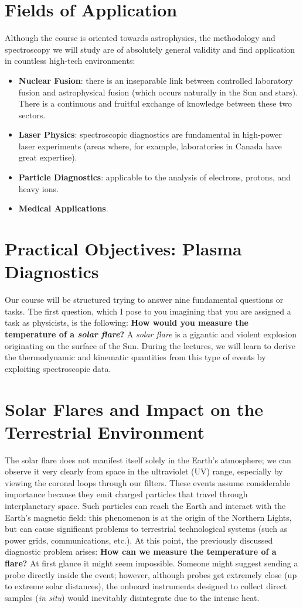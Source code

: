 \section{Fields of Application}
Although the course is oriented towards astrophysics, the methodology and spectroscopy we will study are of absolutely general validity and find application in countless high-tech environments:\begin{itemize}\item \textbf{Nuclear Fusion}: there is an inseparable link between controlled laboratory fusion and astrophysical fusion (which occurs naturally in the Sun and stars). There is a continuous and fruitful exchange of knowledge between these two sectors.\item \textbf{Laser Physics}: spectroscopic diagnostics are fundamental in high-power laser experiments (areas where, for example, laboratories in Canada have great expertise).\item \textbf{Particle Diagnostics}: applicable to the analysis of electrons, protons, and heavy ions.\item \textbf{Medical Applications}.\end{itemize}

\section{Practical Objectives: Plasma Diagnostics}
Our course will be structured trying to answer nine fundamental questions or tasks. The first question, which I pose to you imagining that you are assigned a task as physicists, is the following: \textbf{How would you measure the temperature of a \textit{solar flare}?} A \textit{solar flare} is a gigantic and violent explosion originating on the surface of the Sun. During the lectures, we will learn to derive the thermodynamic and kinematic quantities from this type of events by exploiting spectroscopic data.

\section{Solar Flares and Impact on the Terrestrial Environment}The solar flare does not manifest itself solely in the Earth's atmosphere; we can observe it very clearly from space in the ultraviolet (UV) range, especially by viewing the coronal loops through our filters. These events assume considerable importance because they emit charged particles that travel through interplanetary space. Such particles can reach the Earth and interact with the Earth's magnetic field: this phenomenon is at the origin of the Northern Lights, but can cause significant problems to terrestrial technological systems (such as power grids, communications, etc.). At this point, the previously discussed diagnostic problem arises: \textbf{How can we measure the temperature of a flare?} At first glance it might seem impossible. Someone might suggest sending a probe directly inside the event; however, although probes get extremely close (up to extreme solar distances), the onboard instruments designed to collect direct samples (\textit{in situ}) would inevitably disintegrate due to the intense heat.

